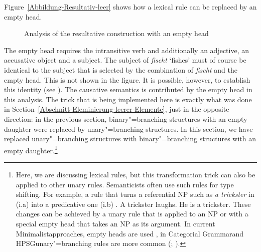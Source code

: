 Figure~\vref{Abbildung-Resultativ-leer} shows how a lexical rule can be replaced by an empty head.
\begin{figure}
\centering
\begin{sideways}
\end{sideways}
\caption{\label{Abbildung-Resultativ-leer}Analysis of the resultative construction with an empty head}
\end{figure}%
The empty head requires the intransitive verb and additionally an adjective, an accusative object and a subject.
The subject of \emph{fischt} `fishes' must of course be identical to the subject that is selected by the combination
of \emph{fischt} and the empty head. This is not shown in the figure.
It is possible, however, to establish this identity (see \citealp{HN94a}). The causative semantics is contributed by
the empty head in this analysis. The trick that is being implemented here is exactly what was done in Section~\ref{Abschnitt-Eleminierung-leerer-Elemente},
just in the opposite direction: in the previous section, binary"=branching structures with an empty daughter were replaced by unary"=branching structures.
In this section, we have replaced unary"=branching structures with binary"=branching structures with an empty daughter.\footnote{
	Here, we are discussing lexical rules, but this transformation trick can also be applied to
        other unary rules. Semanticists often use such rules for type shifting. For
        example, a rule that turns a referential NP such as \emph{a trickster} in (i.a) into a
        predicative one (i.b) \citep{Partee87a-u}.
\eal
\ex A trickster laughs.
\ex He is a trickster.
\zl
These changes can be achieved by a unary rule that is applied to an NP or with a special empty head that takes an NP as its argument. In current Minimalist\indexmp approaches,
empty heads are used \citep[]{Ramchand2005a}, in Categorial Grammar\indexcg and HPSG\indexhpsg unary"=branching rules are more common (\citealp[--92]{Flickinger2008a}; \citealp{MuellerPredication,MuellerCopula}).
}

